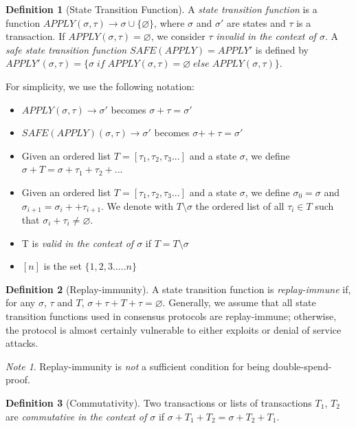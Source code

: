 \documentclass[11pt,a4paper]{report}
\theoremstyle{plain}
\theoremstyle{definition}
\newtheorem{defn}{Definition}[chapter]
\theoremstyle{remark}
\newtheorem*{note}{Note}
\begin{document}
\begin{defn}[State Transition Function]
A \emph{state transition function} is a function $APPLY(\sigma, \tau) \rightarrow \sigma \cup \{\varnothing\}$, where $\sigma$ and $\sigma'$ are states and $\tau$ is a transaction. If $APPLY(\sigma, \tau) = \varnothing$, we consider $\tau$ \emph{invalid in the context of $\sigma$}. A \emph{safe state transition function} $SAFE(APPLY) = APPLY'$ is defined by $APPLY'(\sigma, \tau) = \{\sigma \; if \; APPLY(\sigma, \tau) = \varnothing \; else \; APPLY(\sigma, \tau)\}$.
\end{defn}

For simplicity, we use the following notation:

\begin{itemize}
\item
$APPLY(\sigma, \tau) \rightarrow \sigma'$ becomes $\sigma + \tau = \sigma'$
\item
$SAFE(APPLY)(\sigma, \tau) \rightarrow \sigma'$ becomes $\sigma {++} \tau = \sigma'$
\item  
Given an ordered list $T = [\tau_1, \tau_2, \tau_3...]$ and a state $\sigma$, we define $\sigma + T = \sigma + \tau_1 + \tau_2 + ...$
\item
Given an ordered list $T = [\tau_1, \tau_2, \tau_3...]$ and a state $\sigma$, we define $\sigma_0 = \sigma$ and $\sigma_{i+1} = \sigma_i ++ \tau_{i+1}$. We denote with $T \setminus \sigma$ the ordered list of all $\tau_i \in T$ such that $\sigma_i + \tau_i \ne \varnothing$.
\item
T is \emph{valid in the context of $\sigma$} if $T = T \setminus \sigma$
\item
$[n]$ is the set $\{1, 2, 3..... n\}$
\end{itemize}

\begin{defn}[Replay-immunity]
A state transition function is \emph{replay-immune} if, for any $\sigma$, $\tau$ and $T$, $\sigma + \tau + T + \tau = \varnothing$. Generally, we assume that all state transition functions used in consensus protocols are replay-immune; otherwise, the protocol is almost certainly vulnerable to either exploits or denial of service attacks.
\end{defn}

\begin{note}
Replay-immunity is \emph{not} a sufficient condition for being double-spend-proof.
\end{note}

\begin{defn}[Commutativity]
Two transactions or lists of transactions $T_1$, $T_2$ are \emph{commutative in the context of $\sigma$} if $\sigma + T_1 + T_2 = \sigma + T_2 + T_1$.
\end{defn}
\end{document}
